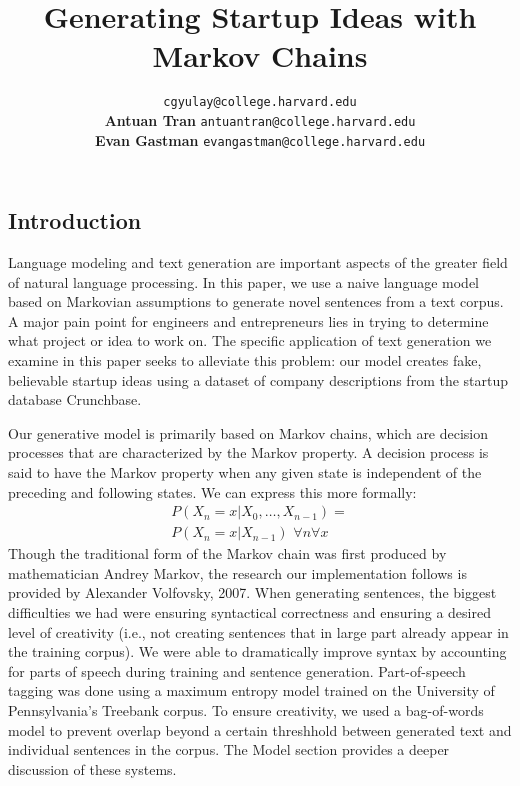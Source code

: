 \documentclass[11pt]{article}
\title{Generating Startup Ideas with Markov Chains}
\author{
  \noindent\makebox[0.57\textwidth][l]{\textbf{Colton Gyulay}} \hfill
  \texttt{cgyulay@college.harvard.edu}\\
  \textbf{Antuan Tran} \hfill
  \texttt{antuantran@college.harvard.edu}\\
  \textbf{Evan Gastman} \hfill
  \texttt{evangastman@college.harvard.edu}
}
\begin{document}
\maketitle{}

\begin{multicols}{2}
\section{Introduction}

Language modeling and text generation are important aspects of the greater
field of natural language processing. In this paper, we use a naive language
model based on Markovian assumptions to generate novel sentences from a text
corpus. A major pain point for engineers and entrepreneurs lies in trying to
determine what project or idea to work on. The specific application of text
generation we examine in this paper seeks to alleviate this problem: our model creates fake, believable startup ideas using a dataset of company descriptions from the startup database Crunchbase.

Our generative model is primarily based on Markov chains, which are decision
processes that are characterized by the Markov property. A decision process is said to have the Markov property when any given state is independent of the preceding and following states. We can express this more formally:
\begin{multline}
  P(X_n = x|X_0,\dots,X_{n-1}) =\\
  P(X_n = x|X_{n-1})\,\,\forall{n}\forall{x}
\end{multline}
Though the traditional form of the Markov chain was first produced by mathematician Andrey Markov, the research our implementation follows is
provided by Alexander Volfovsky, 2007.\cite{volfovsky2007} When generating sentences, the biggest difficulties we had were ensuring syntactical correctness and ensuring a desired level of creativity (i.e., not creating sentences that in large part already appear in the training corpus). We were able to dramatically improve syntax by accounting for parts of speech during training and sentence generation. Part-of-speech tagging was done using a maximum entropy model
trained on the University of Pennsylvania's Treebank corpus.\cite{ratnaparkhi1996} To ensure creativity, we used a bag-of-words model to prevent overlap beyond a certain threshhold between generated text and individual sentences in the corpus. The Model section provides a deeper discussion of these systems.


\end{multicols}
\end{document}
